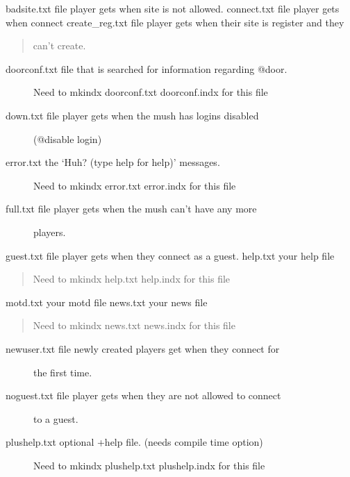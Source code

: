 \documentclass[letterpaper,10pt,english]{sphinxmanual}
\begin{document}
\sphinxAtStartPar
badsite.txt            \sphinxhyphen{} file player gets when site is not allowed.
connect.txt            \sphinxhyphen{} file player gets when connect
create\_reg.txt         \sphinxhyphen{} file player gets when their site is register and they
\begin{quote}

\sphinxAtStartPar
can’t create.
\end{quote}
\begin{description}
\item[{doorconf.txt           \sphinxhyphen{} file that is searched for information regarding @door.}] \leavevmode
\sphinxAtStartPar
{}  Need to mkindx doorconf.txt doorconf.indx for this file

\item[{down.txt               \sphinxhyphen{} file player gets when the mush has logins disabled}] \leavevmode
\sphinxAtStartPar
(@disable login)

\item[{error.txt              \sphinxhyphen{} the ‘Huh? (type help for help)’ messages.}] \leavevmode
\sphinxAtStartPar
{}  Need to mkindx error.txt error.indx for this file

\item[{full.txt               \sphinxhyphen{} file player gets when the mush can’t have any more}] \leavevmode
\sphinxAtStartPar
players.

\end{description}

\sphinxAtStartPar
guest.txt              \sphinxhyphen{} file player gets when they connect as a guest.
help.txt               \sphinxhyphen{} your help file
\begin{quote}

\sphinxAtStartPar
{}  Need to mkindx help.txt help.indx for this file
\end{quote}

\sphinxAtStartPar
motd.txt               \sphinxhyphen{} your motd file
news.txt               \sphinxhyphen{} your news file
\begin{quote}

\sphinxAtStartPar
{}  Need to mkindx news.txt news.indx for this file
\end{quote}
\begin{description}
\item[{newuser.txt            \sphinxhyphen{} file newly created players get when they connect for}] \leavevmode
\sphinxAtStartPar
the first time.

\item[{noguest.txt            \sphinxhyphen{} file player gets when they are not allowed to connect}] \leavevmode
\sphinxAtStartPar
to a guest.

\item[{plushelp.txt           \sphinxhyphen{} optional +help file. (needs compile time option)}] \leavevmode
\sphinxAtStartPar
{}  Need to mkindx plushelp.txt plushelp.indx for this file

\end{description}
\end{document}
